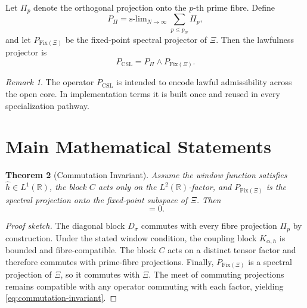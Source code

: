 \documentclass[11pt]{article}
\theoremstyle{plain}
\newtheorem{theorem}{Theorem}[section]
\theoremstyle{definition}
\theoremstyle{remark}
\newtheorem{remark}[theorem]{Remark}
\newcommand{\R}{\mathbb{R}}
\newcommand{\Om}{\boldsymbol{\Omega}}
\newcommand{\PCSL}{P_{\mathrm{CSL}}}
\newcommand{\sot}{\mathrm{s\text{-}lim}}
\begin{document}
Let \(\Pi_p\) denote the orthogonal projection onto the \(p\)-th prime fibre. Define
\begin{equation}
P_{\Pi}
=
\sot_{N \to \infty}\;
\sum_{p \le p_N} \Pi_p,
\label{eq:Ppi}
\end{equation}
and let \(P_{\mathrm{Fix}(\Xi)}\) be the fixed-point spectral projector of \(\Xi\). Then the lawfulness projector is
\begin{equation}
\PCSL = P_{\Pi} \wedge P_{\mathrm{Fix}(\Xi)}.
\label{eq:pcsl}
\end{equation}

\begin{remark}
The operator \(\PCSL\) is intended to encode lawful admissibility across the open core. In implementation terms it is built once and reused in every specialization pathway.
\end{remark}

\section{Main Mathematical Statements}

\begin{theorem}[Commutation Invariant]
Assume the window function satisfies \(\widehat{h} \in L^1(\R)\), the block \(C\) acts only on the \(L^2(\R)\)-factor, and \(P_{\mathrm{Fix}(\Xi)}\) is the spectral projection onto the fixed-point subspace of \(\Xi\). Then
\begin{equation}
[\Om,\PCSL]=0.
\label{eq:commutation-invariant}
\end{equation}
\end{theorem}

\begin{proof}[Proof sketch]
The diagonal block \(D_\sigma\) commutes with every fibre projection \(\Pi_p\) by construction. Under the stated window condition, the coupling block \(K_{\alpha,h}\) is bounded and fibre-compatible. The block \(C\) acts on a distinct tensor factor and therefore commutes with prime-fibre projections. Finally, \(P_{\mathrm{Fix}(\Xi)}\) is a spectral projection of \(\Xi\), so it commutes with \(\Xi\). The meet of commuting projections remains compatible with any operator commuting with each factor, yielding \eqref{eq:commutation-invariant}.
\end{proof}
\end{document}
